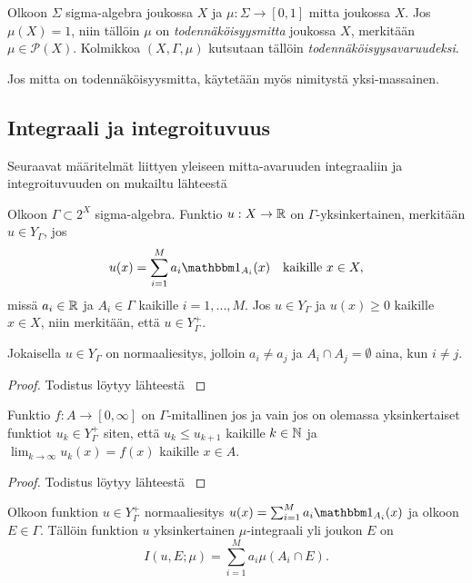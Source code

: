 \documentclass[12pt,oneside,a4paper]{amsbook} %
\begin{document}
\begin{definition}
Olkoon $\Sigma$ sigma-algebra joukossa $X$ ja $\mu:\Sigma \to [0,1]$ mitta joukossa $X$. Jos $\mu(X) = 1$, niin tällöin $\mu$ on \textit{todennäköisyysmitta} joukossa $X$, merkitään $\mu \in \mathcal{P}(X)$. 
    Kolmikkoa $(X, \Gamma, \mu)$ kutsutaan tällöin \textit{todennäköisyysavaruudeksi}.
\end{definition}
Jos mitta on todennäköisyysmitta, käytetään myös nimitystä yksi-massainen.


\subsection{Integraali ja integroituvuus}
Seuraavat määritelmät liittyen yleiseen mitta-avaruuden integraaliin ja integroituvuuden on mukailtu lähteestä \cite[s.110-111]{lehrbäck}
\begin{definition}
    Olkoon $\Gamma \subset 2^X$ sigma-algebra. Funktio $u: X \to \mathbb{R}$ on $\Gamma$-yksinkertainen, merkitään $u \in Y_\Gamma$, jos
    \begin{align*}
        u(x) = \sum_{i=1}^M a_i \indfct{A_i}(x) \quad \text{kaikille } x \in X,
    \end{align*}
    missä $a_i \in \mathbb{R}$ ja $A_i \in \Gamma$ kaikille $i = 1, ..., M.$ Jos $u \in Y_\Gamma$ ja $u(x) \ge 0$ kaikille $x \in X$, niin merkitään, että $u \in Y_\Gamma^+$.
\end{definition}

\begin{lemma}
    Jokaisella $u \in Y_\Gamma$ on normaaliesitys, jolloin $a_i \ne a_j$ ja $A_i \cap A_j = \emptyset$ aina, kun $i \ne j$.
\end{lemma}
\begin{proof}
    Todistus löytyy lähteestä \cite[s.110]{lehrbäck}
\end{proof}

\begin{lemma}
    Funktio $f: A \to [0, \infty]$ on $\Gamma$-mitallinen jos ja vain jos on olemassa yksinkertaiset funktiot $u_k \in Y_\Gamma^+$ siten, että $u_k \le u_{k+1}$ kaikille $k \in \mathbb{N}$ ja $\lim_{k\to\infty}u_k(x) = f(x)$ kaikille $x \in A$.
\end{lemma}
\begin{proof}
    Todistus löytyy lähteestä \cite[s.110]{lehrbäck}
\end{proof}

\begin{definition}
    Olkoon funktion $u \in Y_\Gamma^+$ normaaliesitys $u(x) = \sum_{i=1}^M a_i\indfct{A_i}(x)$ ja olkoon $E \in \Gamma$. Tällöin funktion $u$ yksinkertainen $\mu$-integraali yli joukon $E$ on
    \begin{equation*}
        I(u, E; \mu) = \sum_{i=1}^M a_i \mu(A_i \cap E).
    \end{equation*}
\end{definition}
\end{document}
